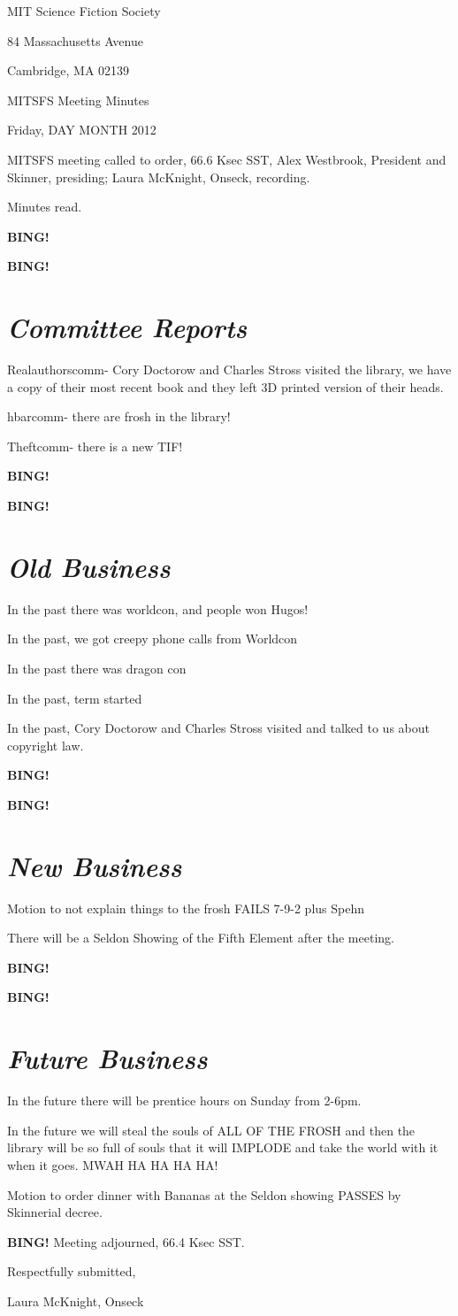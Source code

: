 \documentclass[10pt]{article}
\newcommand{\bing}{{\bf BING!} }
\newcommand{\goto}[1]{\bing \vskip 12pt \section*{{\em{#1}}}}
\newcommand{\ps}{ plus Spehn\xspace}
\newcommand{\skinner}{Alex Westbrook, President and Skinner}
\newcommand{\onseck}{Laura McKnight, Onseck}
\newcommand{\meetingdate}{Friday, DAY MONTH 2012}
\begin{document}
\begin{center}

MIT Science Fiction Society

84 Massachusetts Avenue

Cambridge, MA 02139

\vspace{12pt}

MITSFS Meeting Minutes

\meetingdate

\end{center}

\vspace{18pt}

\setlength{\parskip}{6pt}

\noindent
MITSFS meeting called to order, 66.6 Ksec SST,
\skinner, presiding; \onseck, recording.

Minutes read.

\bing

\goto{Committee Reports}

Realauthorscomm- Cory Doctorow and Charles Stross visited the library, we have a copy of their most recent book and they left 3D printed version of their heads.

hbarcomm- there are frosh in the library!

Theftcomm- there is a new TIF!

\bing

\goto{Old Business}
In the past there was worldcon, and people won Hugos!

In the past, we got creepy phone calls from Worldcon

In the past there was dragon con

In the past, term started

In the past, Cory Doctorow and Charles Stross visited and talked to us about copyright law. 

\bing

\goto{New Business}

Motion to not explain things to the frosh FAILS 7-9-2\ps

There will be a Seldon Showing of the Fifth Element after the meeting.

\bing

\goto{Future Business}

In the future there will be prentice hours on Sunday from 2-6pm.

In the future we will steal the souls of ALL OF THE FROSH and then the library will be so full of souls that it will IMPLODE and take the world with it when it goes. MWAH HA HA HA HA!

Motion to order dinner with Bananas at the Seldon showing PASSES by Skinnerial decree.

\bing
\noindent
Meeting adjourned, 66.4 Ksec SST.

\vspace{18pt}

\centerline{Respectfully submitted,}
\centerline{\onseck}
\end{document}
